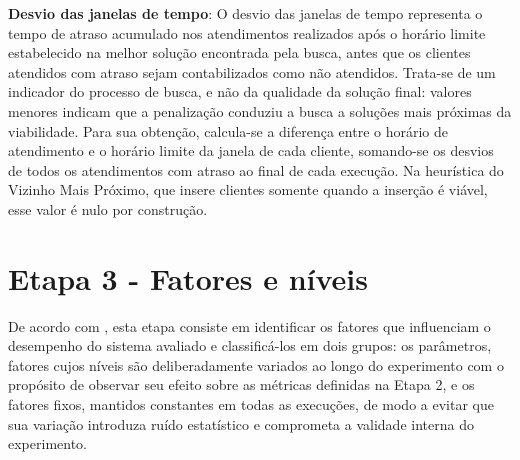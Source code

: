 \begin{alineas}
	\item \textbf{Desvio das janelas de tempo}: O desvio das janelas de tempo representa
	o tempo de atraso acumulado nos atendimentos realizados após o horário limite
	estabelecido na melhor solução encontrada pela busca, antes que os clientes
	atendidos com atraso sejam contabilizados como não atendidos. Trata-se de um
	indicador do processo de busca, e não da qualidade da solução final: valores
	menores indicam que a penalização conduziu a busca a soluções mais próximas da
	viabilidade. Para sua obtenção, calcula-se a diferença entre o horário de
	atendimento e o horário limite da janela de cada cliente, somando-se os desvios de
	todos os atendimentos com atraso ao final de cada execução. Na heurística do
	Vizinho Mais Próximo, que insere clientes somente quando a inserção é viável, esse
	valor é nulo por construção.
\end{alineas}

\section{Etapa 3 - Fatores e níveis}
\label{sec:etapa3}

De acordo com , esta etapa consiste em identificar os fatores que
influenciam o desempenho do sistema avaliado e classificá-los em dois grupos: os
parâmetros, fatores cujos níveis são deliberadamente variados ao longo do experimento
com o propósito de observar seu efeito sobre as métricas definidas na Etapa 2, e os
fatores fixos, mantidos constantes em todas as execuções, de modo a evitar que sua
variação introduza ruído estatístico e comprometa a validade interna do experimento.

